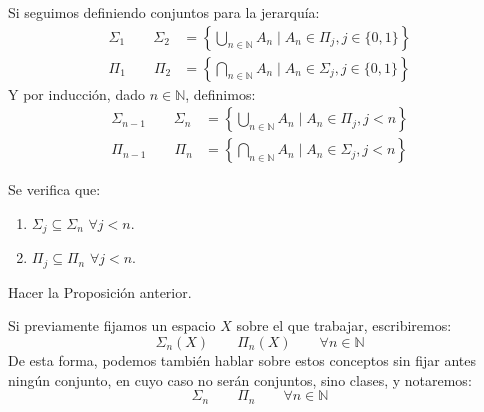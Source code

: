 Si seguimos definiendo conjuntos para la jerarquía:
\begin{align*}
    \Sigma_1 \qquad \Sigma_2 &= \left\{\bigcup_{n\in \mathbb{N}} A_n \mid A_n \in \Pi_j, j \in \{0,1\}\right\} \\
    \Pi_1 \qquad \Pi_2 &= \left\{\bigcap_{n\in \mathbb{N}}A_n \mid A_n\in \Sigma_j, j\in \{0,1\}\right\}
\end{align*}
Y por inducción, dado $n\in \mathbb{N}$, definimos:
\begin{align*}
    \Sigma_{n-1} \qquad \Sigma_n &= \left\{\bigcup_{n\in \mathbb{N}} A_n \mid A_n \in \Pi_j, j<n\right\} \\
    \Pi_{n-1} \qquad \Pi_n &= \left\{\bigcap_{n\in \mathbb{N}} A_n \mid A_n \in \Sigma_j, j<n\right\}
\end{align*}

\begin{prop}
    Se verifica que:
    \begin{enumerate}
        \item $\Sigma_j \subseteq \Sigma_n$ $\forall j<n$.
        \item $\Pi_j \subseteq \Pi_n$ $\forall j<n$.
    \end{enumerate}
\end{prop}

\begin{ejercicio}
    Hacer la Proposición anterior.
\end{ejercicio}

\begin{notacion}
    Si previamente fijamos un espacio $X$ sobre el que trabajar, escribiremos:
    \begin{equation*}
        \Sigma_n(X) \qquad \Pi_n(X) \qquad \forall n\in \mathbb{N}
    \end{equation*}
    De esta forma, podemos también hablar sobre estos conceptos sin fijar antes ningún conjunto, en cuyo caso no serán conjuntos, sino clases, y notaremos:
    \begin{equation*}
        \Sigma_n \qquad \Pi_n \qquad \forall n\in \mathbb{N}
    \end{equation*}
\end{notacion}

